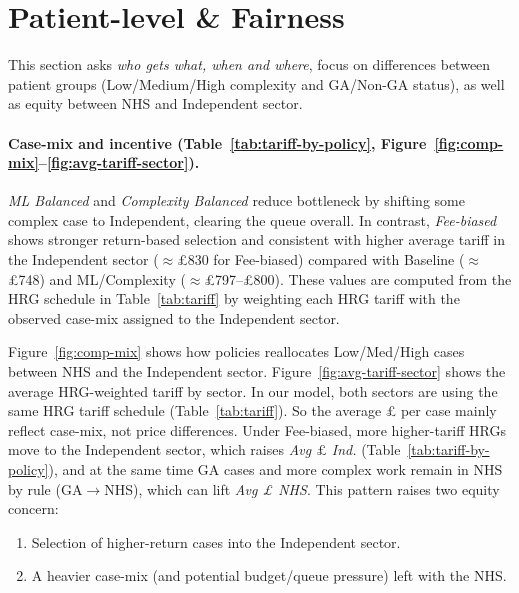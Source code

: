\documentclass[ %
                    author={Nattanan Nawakitbamrung},
                supervisor={Dr. Sébastien Rochat},
                    degree={MSc},
                     title={Developing and Evaluating the Impact of a Single Patient Treatment List (PTL) for an NHS Integrated Care System},
                  subtitle={},
                      type={},
                      year={2025}]{dissertation}
\begin{document}
\section{Patient-level & Fairness}
\label{sec:patient-lev}
This section asks \emph{who gets what, when and where}, focus on differences between patient groups (Low/Medium/High complexity and GA/Non-GA status), as well as equity between NHS and Independent sector.

\paragraph{Case-mix and incentive (Table~\ref{tab:tariff-by-policy}, Figure~\ref{fig:comp-mix}--\ref{fig:avg-tariff-sector}).}
\textit{ML Balanced} and \textit{Complexity Balanced} reduce bottleneck by shifting some complex case to Independent, clearing the queue overall. In contrast, \textit{Fee-biased} shows stronger return-based selection and consistent with higher average tariff in the Independent sector ($\approx$£830 for Fee-biased) compared with Baseline ($\approx$£748) and ML/Complexity ($\approx$£797–£800). These values are computed from the HRG schedule in Table~\ref{tab:tariff} by weighting each HRG tariff with the observed case-mix assigned to the Independent sector. 

Figure~\ref{fig:comp-mix} shows how policies reallocates Low/Med/High cases between NHS and the Independent sector. Figure~\ref{fig:avg-tariff-sector} shows the average HRG-weighted tariff by sector. In our model, both sectors are using the same HRG tariff schedule (Table~\ref{tab:tariff}). So the average \pounds \hspace{0.1cm} per case mainly reflect case-mix, not price differences. Under Fee-biased, more higher-tariff HRGs move to the Independent sector, which raises \textit{Avg $\pounds$ Ind.} (Table~\ref{tab:tariff-by-policy}), and at the same time GA cases and more complex work remain in NHS by rule (GA$\rightarrow$NHS), which can lift  \textit{Avg \pounds{} NHS}. This pattern raises two equity concern: 

\begin{enumerate}
    \item Selection of higher-return cases into the Independent sector.
    \item A heavier case-mix (and potential budget/queue pressure) left with the NHS.
\end{enumerate}
\end{document}
